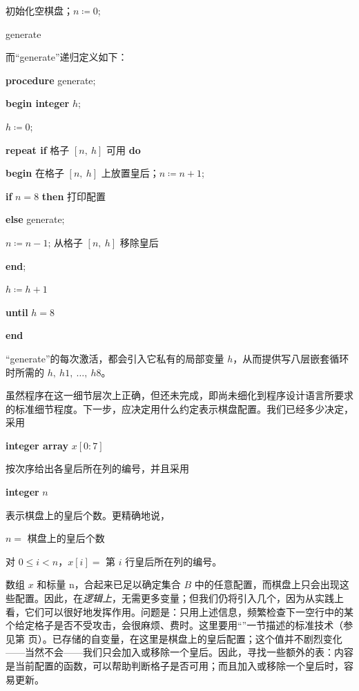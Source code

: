 \quad 初始化空棋盘；$n \coloneq 0$;

\quad generate

\noindent
而“generate”递归定义如下：

\textbf{procedure} generate;

\textbf{begin integer} $h$;

$h \coloneq 0$;

\textbf{repeat if} 格子 $[n,\ h]$ 可用 \textbf{do}

\quad \textbf{\textbf{begin}} 在格子 $[n,\ h]$ 上放置皇后；$n \coloneq n + 1$;

\quad \quad \textbf{if} $n = 8$ \textbf{then} 打印配置

\quad \quad \textbf{else} generate;

\quad \quad $n \coloneq n - 1$; 从格子 $[n,\ h]$ 移除皇后

\quad \textbf{end};

\quad $h \coloneq h + 1$

\quad \textbf{until} $h = 8$

\textbf{end}

“generate”的每次激活，都会引入它私有的局部变量 $h$，从而提供写八层嵌套循环时所需的 $h,\ h1,\ \dots,\ h8$。

虽然程序在这一细节层次上正确，但还未完成，即尚未细化到程序设计语言所要求的标准细节程度。下一步，应决定用什么约定表示棋盘配置。我们已经多少决定，采用

\quad \textbf{integer array} $x[0:7]$

\noindent
按次序给出各皇后所在列的编号，并且采用

\quad \textbf{integer} $n$

\noindent
表示棋盘上的皇后个数。更精确地说，

$n =$ 棋盘上的皇后个数

\parindent 对 $0 \leqslant i < n$，$x[i] =$ 第 $i$ 行皇后所在列的编号。

数组 $x$ 和标量 n，合起来已足以确定集合 $B$ 中的任意配置，而棋盘上只会出现这些配置。因此，在\textit{逻辑上}，无需更多变量；但我们仍将引入几个，因为从实践上看，它们可以很好地发挥作用。问题是：只用上述信息，频繁检查下一空行中的某个给定格子是否不受攻击，会很麻烦、费时。这里要用“”一节描述的标准技术（参见第 \pageref{sec:trading-storage-for-computation-speed} 页）。已存储的自变量，在这里是棋盘上的皇后配置；这个值并不剧烈变化——当然不会——我们只会加入或移除一个皇后。因此，寻找一些额外的表：内容是当前配置的函数，可以帮助判断格子是否可用；而且加入或移除一个皇后时，容易更新。

